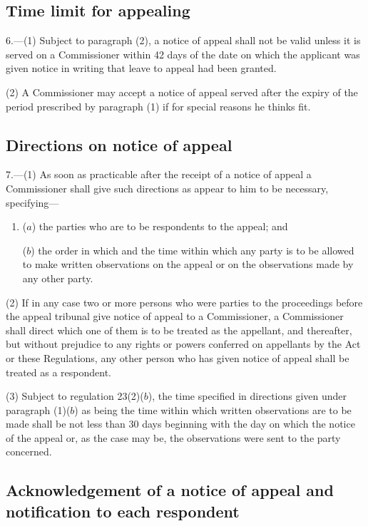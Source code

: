 \documentclass[a4paper]{article}
\begin{document}
\subsection[6. Time limit for appealing]{Time limit for appealing}

6.—(1) Subject to paragraph (2), a notice of appeal shall not be valid unless it is served on a Commissioner within 42 days of the date on which the applicant was given notice in writing that leave to appeal had been granted.

(2) A Commissioner may accept a notice of appeal served after the expiry of the period prescribed by paragraph (1) if for special reasons he thinks fit.

\subsection[7. Directions on notice of appeal]{Directions on notice of appeal}

7.—(1) As soon as practicable after the receipt of a notice of appeal a Commissioner shall give such directions as appear to him to be necessary, specifying—
\begin{enumerate}\item[]
($a$) the parties who are to be respondents to the appeal; and

($b$) the order in which and the time within which any party is to be allowed to make written observations on the appeal or on the observations made by any other party.
\end{enumerate}

(2) If in any case two or more persons who were parties to the proceedings before the appeal tribunal give notice of appeal to a Commissioner, a Commissioner shall direct which one of them is to be treated as the appellant, and thereafter, but without prejudice to any rights or powers conferred on appellants by the Act or these Regulations, any other person who has given notice of appeal shall be treated as a respondent.

(3) Subject to regulation 23(2)($b$), the time specified in directions given under paragraph (1)($b$) as being the time within which written observations are to be made shall be not less than 30 days beginning with the day on which the notice of the appeal or, as the case may be, the observations were sent to the party concerned.

\subsection[8. Acknowledgement of a notice of appeal and notification to each respondent]{Acknowledgement of a notice of appeal and notification to each respondent}
\end{document}
